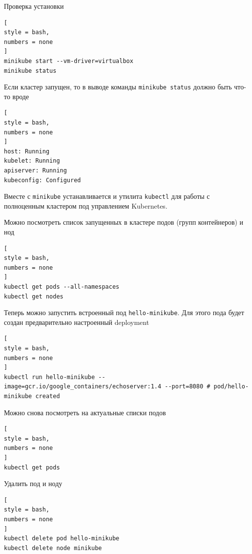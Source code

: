 \documentclass[%
	11pt,
	a4paper,
	utf8,
		]{article}
\begin{document}
Проверка установки
\begin{lstlisting}[
style = bash,
numbers = none	
]
minikube start --vm-driver=virtualbox
minikube status
\end{lstlisting}

Если кластер запущен, то в выводе команды \texttt{minikube status} должно быть что-то вроде
\begin{lstlisting}[
style = bash,
numbers = none	
]
host: Running
kubelet: Running
apiserver: Running
kubeconfig: Configured
\end{lstlisting}

Вместе с \texttt{minikube} устанавливается и утилита \texttt{kubectl} для работы с полноценным кластером под управлением Kubernetes.

Можно посмотреть список запущенных в кластере подов (групп контейнеров) и нод
\begin{lstlisting}[
style = bash,
numbers = none	
]
kubectl get pods --all-namespaces
kubectl get nodes
\end{lstlisting}

Теперь можно запустить встроенный под \texttt{hello-minikube}. Для этого пода будет создан предварительно настроенный deployment
\begin{lstlisting}[
style = bash,
numbers = none	
]
kubectl run hello-minikube --image=gcr.io/google_containers/echoserver:1.4 --port=8080 # pod/hello-minikube created
\end{lstlisting}

Можно снова посмотреть на актуальные списки подов
\begin{lstlisting}[
style = bash,
numbers = none	
]
kubectl get pods
\end{lstlisting}

Удалить под и ноду
\begin{lstlisting}[
style = bash,
numbers = none	
]
kubectl delete pod hello-minikube
kubectl delete node minikube
\end{lstlisting}



\begin{thebibliography}{99}
\end{thebibliography}


\lstlistoflistings{}
\end{document}

